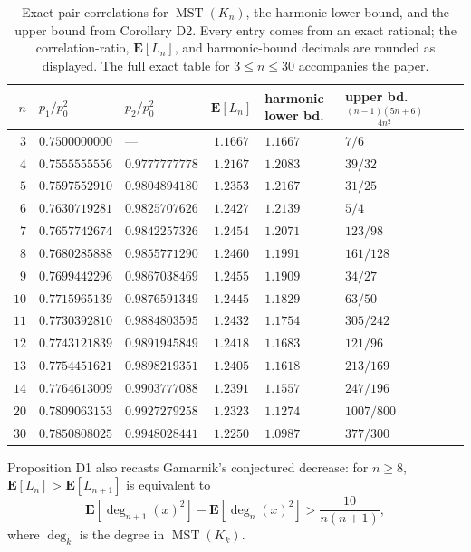 \documentclass[11pt,a4paper]{amsart}
\theoremstyle{plain}
\theoremstyle{definition}
\theoremstyle{remark}
\newcommand{\MST}{\operatorname{MST}}
\newcommand{\E}{\mathbf{E}}
\DeclareMathOperator{\dg}{deg}
\begin{document}
\begin{table}[t]
\centering
\begin{tabular}{rllcll}
\toprule
$n$ & $p_1/p_0^2$ & $p_2/p_0^2$ & $\E[L_n]$ & harmonic lower bd.
& upper bd.\ $\frac{(n-1)(5n+6)}{4n^2}$\\
\midrule
$3$  & $0.7500000000$ & ---            & $1.1667$ & $1.1667$ & $7/6$\\
$4$  & $0.7555555556$ & $0.9777777778$ & $1.2167$ & $1.2083$ & $39/32$\\
$5$  & $0.7597552910$ & $0.9804894180$ & $1.2353$ & $1.2167$ & $31/25$\\
$6$  & $0.7630719281$ & $0.9825707626$ & $1.2427$ & $1.2139$ & $5/4$\\
$7$  & $0.7657742674$ & $0.9842257326$ & $1.2454$ & $1.2071$ & $123/98$\\
$8$  & $0.7680285888$ & $0.9855771290$ & $1.2460$ & $1.1991$ & $161/128$\\
$9$  & $0.7699442296$ & $0.9867038469$ & $1.2455$ & $1.1909$ & $34/27$\\
$10$ & $0.7715965139$ & $0.9876591349$ & $1.2445$ & $1.1829$ & $63/50$\\
$11$ & $0.7730392810$ & $0.9884803595$ & $1.2432$ & $1.1754$ & $305/242$\\
$12$ & $0.7743121839$ & $0.9891945849$ & $1.2418$ & $1.1683$ & $121/96$\\
$13$ & $0.7754451621$ & $0.9898219351$ & $1.2405$ & $1.1618$ & $213/169$\\
$14$ & $0.7764613009$ & $0.9903777088$ & $1.2391$ & $1.1557$ & $247/196$\\
$20$ & $0.7809063153$ & $0.9927279258$ & $1.2323$ & $1.1274$ & $1007/800$\\
$30$ & $0.7850808025$ & $0.9948028441$ & $1.2250$ & $1.0987$ & $377/300$\\
\bottomrule
\end{tabular}
\caption{Exact pair correlations for $\MST(K_n)$, the harmonic lower bound,
and the upper bound from Corollary D2. Every entry comes from an exact rational;
the correlation-ratio, $\E[L_n]$, and harmonic-bound decimals are rounded as
displayed. The full exact table for $3\le n\le30$ accompanies the paper.}
\label{tab:exact}
\end{table}

Proposition D1 also recasts Gamarnik's conjectured decrease: for $n\ge8$,
$\E[L_n]>\E[L_{n+1}]$ is equivalent to
\[
\E[\dg_{n+1}(x)^2]-\E[\dg_n(x)^2]>\frac{10}{n(n+1)},
\]
where $\dg_k$ is the degree in $\MST(K_k)$.
\end{document}
